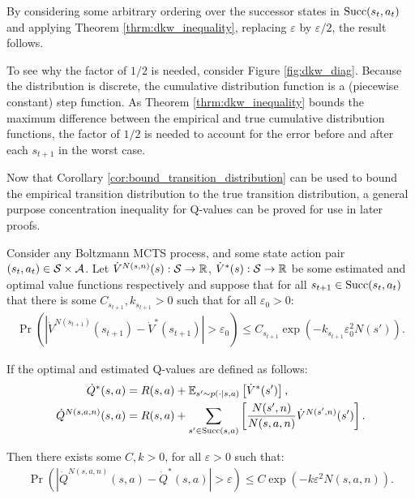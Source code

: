             \begin{proofoutline}
                By considering some arbitrary ordering over the successor states in ${\textnormal{Succ}(s_t,a_t)}$ and applying Theorem \ref{thrm:dkw_inequality}, replacing $\varepsilon$ by $\varepsilon/2$, the result follows.

                To see why the factor of $1/2$ is needed, consider Figure \ref{fig:dkw_diag}. Because the distribution is discrete, the cumulative distribution function is a (piecewise constant) step function. As Theorem \ref{thrm:dkw_inequality} bounds the maximum difference between the empirical and true cumulative distribution functions, the factor of $1/2$ is needed to account for the error before and after each $s_{t+1}$ in the worst case.
            \end{proofoutline}




            


        Now that Corollary \ref{cor:bound_transition_distribution} can be used to bound  the empirical transition distribution to the true transition distribution,  a general purpose concentration inequality for Q-values can be proved for use in later proofs.

        \begin{lemma} \label{lem:stochastic_step}
            Consider any Boltzmann MCTS process, and some state action pair $(s_t,a_t)\in\mathcal{S}\times\mathcal{A}$. Let $\dot{V}^{N(s,n)}(s):\mathcal{S}\rightarrow \mathbb{R}$, $\dot{V}^*(s):\mathcal{S}\rightarrow \mathbb{R}$ be some estimated and optimal value functions respectively and suppose that for all $s_{t+1}\in{\textnormal{Succ}(s_t,a_t)}$ that there is some $C_{s_{t+1}}, k_{s_{t+1}}>0$ such that for all $\varepsilon_0 >0$:
            \begin{align}
                \Pr\left(\left| \dot{V}^{N(s_{t+1})}(s_{t+1}) - \dot{V}^*(s_{t+1}) \right| > \varepsilon_0 \right) \leq C_{s_{t+1}}\exp(-k_{s_{t+1}}\varepsilon_0^2 N(s')).
            \end{align}
            
            If the optimal and estimated Q-values are defined as follows: 
            \begin{align}
                \dot{Q}^*(s,a)&=R(s,a)+\mathbb{E}_{s'\sim p(\cdot|s,a)}\left[\dot{V}^*(s')\right], \\
                \dot{Q}^{N(s,a,n)}(s,a)&=R(s,a)+\sum_{s'\in{\textnormal{Succ}(s,a)}} \left[
                    \frac{N(s',n)}{N(s,a,n)} \dot{V}^{N(s',n)}(s')\right].
            \end{align}
            
            Then there exists some $C,k>0$, for all $\varepsilon>0$ such that:
            \begin{align}
                \Pr\left(\left| \dot{Q}^{N(s,a,n)}(s,a) - \dot{Q}^*(s,a) \right| > \varepsilon \right) \leq C\exp(-k\varepsilon^2 N(s,a,n)).
            \end{align}
        \end{lemma}

